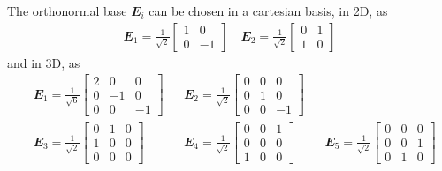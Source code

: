 \documentclass[10pt,a4paper,fleqn]{article}
\renewcommand{\ts}[1]{\mathbfit{#1}}
\begin{document}
The orthonormal base $\ts E_i$ can be chosen in a cartesian basis, in 2D, as
\begin{align}
 \ts E_1 = \frac{1}{\sqrt{2}}\begin{bmatrix} 1 & 0\\ 0 & -1\end{bmatrix}\quad \ts E_2 = \frac{1}{\sqrt{2}}\begin{bmatrix} 0 & 1\\ 1 & 0\end{bmatrix}
\end{align}
and in 3D, as
\begin{align}
 &\ts E_1 = \frac{1}{\sqrt{6}}\begin{bmatrix} 2 & 0 & 0\\ 0 & -1 & 0\\ 0 & 0 & -1\end{bmatrix}
 &&\ts E_2 = \frac{1}{\sqrt{2}}\begin{bmatrix} 0 & 0 & 0\\ 0 & 1 & 0 \\ 0 & 0 & -1\end{bmatrix}
 &&\\
 &\ts E_3 = \frac{1}{\sqrt{2}}\begin{bmatrix} 0 & 1 & 0\\ 1 & 0 & 0 \\ 0 & 0 & 0\end{bmatrix}
 &&\ts E_4 = \frac{1}{\sqrt{2}}\begin{bmatrix} 0 & 0 & 1\\ 0 & 0 & 0 \\ 1 & 0 & 0\end{bmatrix}
 &&\ts E_5 = \frac{1}{\sqrt{2}}\begin{bmatrix} 0 & 0 & 0\\ 0 & 0 & 1 \\ 0 & 1 & 0\end{bmatrix}
\end{align}
\end{document}
